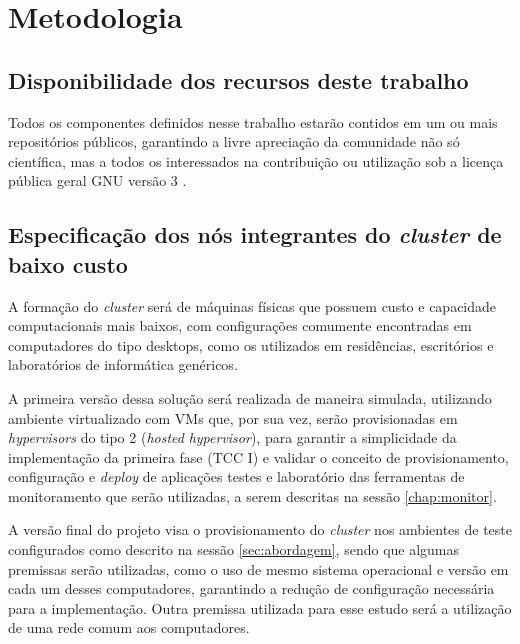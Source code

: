 
\chapter{Metodologia}
\label{chap:metodologia}
\section{Disponibilidade dos recursos deste trabalho}

Todos os componentes definidos nesse trabalho estarão contidos em um ou mais repositórios públicos, garantindo a livre apreciação da comunidade não só científica, mas a todos os interessados na contribuição ou utilização sob a licença pública geral GNU versão 3 \cite{foss2022}.

\section{Especificação dos nós integrantes do  \emph{cluster} de baixo custo}

A formação do  \emph{cluster} será de máquinas físicas que possuem custo e capacidade computacionais mais baixos, com configurações comumente encontradas em computadores do tipo desktops, como os utilizados em residências, escritórios e laboratórios de informática genéricos.

A primeira versão dessa solução será realizada de maneira simulada, utilizando ambiente virtualizado com VMs que, por sua vez, serão provisionadas em \emph{hypervisors} do tipo 2 \cite{comer_cloud_2021} (\emph{hosted} \emph{hypervisor}), para garantir a simplicidade da implementação da primeira fase (TCC I) e validar o conceito de provisionamento, configuração e \emph{deploy} de aplicações testes e laboratório das ferramentas de monitoramento que serão utilizadas, a serem descritas na sessão \ref{chap:monitor}.

A versão final do projeto visa o provisionamento do  \emph{cluster} nos ambientes de teste configurados como descrito na sessão \ref{sec:abordagem}, sendo que algumas premissas serão utilizadas, como o uso de mesmo sistema operacional e versão em cada um desses computadores, garantindo a redução de configuração necessária para a implementação. Outra premissa utilizada para esse estudo será a utilização de uma rede comum aos computadores.

